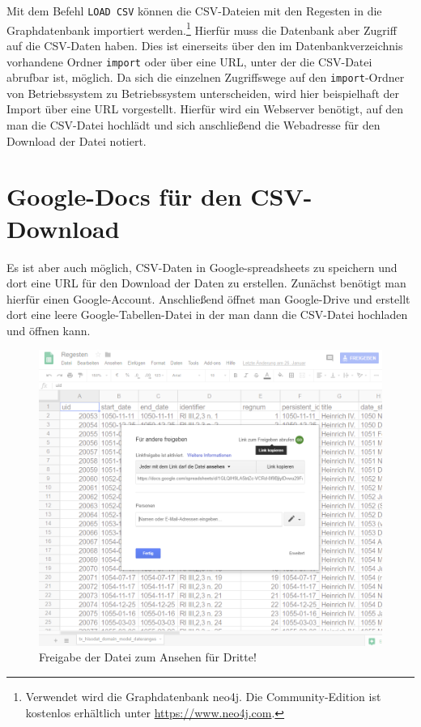 \documentclass[ngerman,]{scrreprt}
\begin{document}
Mit dem Befehl \texttt{LOAD\ CSV} können die CSV-Dateien mit den Regesten in die Graphdatenbank importiert werden.\footnote{Verwendet wird die Graphdatenbank neo4j. Die Community-Edition ist kostenlos erhältlich unter \url{https://www.neo4j.com}.} Hierfür muss die Datenbank aber Zugriff auf die CSV-Daten haben. Dies ist einerseits über den im Datenbankverzeichnis vorhandene Ordner \texttt{import} oder über eine URL, unter der die CSV-Datei abrufbar ist, möglich. Da sich die einzelnen Zugriffswege auf den \texttt{import}-Ordner von Betriebssystem zu Betriebssystem unterscheiden, wird hier beispielhaft der Import über eine URL vorgestellt. Hierfür wird ein Webserver benötigt, auf den man die CSV-Datei hochlädt und sich anschließend die Webadresse für den Download der Datei notiert.

\section{Google-Docs für den CSV-Download}\label{google-docs-fuxfcr-den-csv-download}

Es ist aber auch möglich, CSV-Daten in Google-spreadsheets zu speichern und dort eine URL für den Download der Daten zu erstellen. Zunächst benötigt man hierfür einen Google-Account. Anschließend öffnet man Google-Drive und erstellt dort eine leere Google-Tabellen-Datei in der man dann die CSV-Datei hochladen und öffnen kann.

\begin{figure}
\centering
\includegraphics{Bilder/RI2Graph/google-docs-freigeben.png}
\caption{Freigabe der Datei zum Ansehen für Dritte!}
\end{figure}
\end{document}

